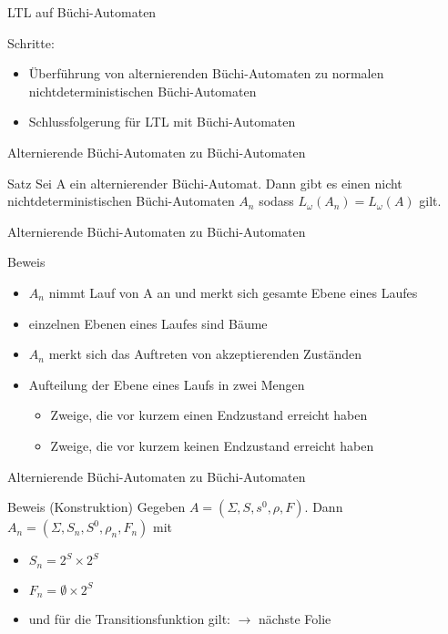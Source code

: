 \begin{frame}{LTL auf Büchi-Automaten}
\begin{block}{Schritte:}
\begin{itemize}
\item Überführung von alternierenden Büchi-Automaten zu normalen nichtdeterministischen Büchi-Automaten
\item Schlussfolgerung für LTL mit Büchi-Automaten
\end{itemize}
\end{block}
\end{frame}

\begin{frame}{Alternierende Büchi-Automaten zu Büchi-Automaten}
\begin{block}{Satz}
Sei A ein alternierender Büchi-Automat. Dann gibt es einen nicht nichtdeterministischen Büchi-Automaten $A_n$ sodass $L_{\omega}(A_n)=L_{\omega}(A)$ gilt.
\end{block}
\end{frame}

\begin{frame}{Alternierende Büchi-Automaten zu Büchi-Automaten}
\begin{block}{Beweis}
\begin{itemize}
\item $A_n$ nimmt Lauf von A an und merkt sich gesamte Ebene eines Laufes
\item einzelnen Ebenen eines Laufes sind Bäume
\item $A_n$ merkt sich das Auftreten von akzeptierenden Zuständen
\item Aufteilung der Ebene eines Laufs in zwei Mengen
\begin{itemize}
\item Zweige, die vor kurzem einen Endzustand erreicht haben
\item Zweige, die vor kurzem keinen Endzustand erreicht haben
\end{itemize}
\end{itemize}
\end{block}
\end{frame}

\begin{frame}{Alternierende Büchi-Automaten zu Büchi-Automaten}
\begin{block}{Beweis (Konstruktion)}
Gegeben $A=(\Sigma,S, s^0, \rho, F)$. Dann $A_n=(\Sigma,S_n,S^0,\rho_n,F_n)$ mit
\begin{itemize}
\item $S_n=2^S\times 2^S$
\item $F_n=\emptyset\times 2^S$
\item und für die Transitionsfunktion gilt: $\rightarrow$ nächste Folie
\end{itemize}
\end{block}
\end{frame}


